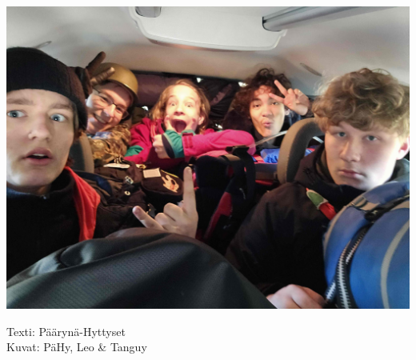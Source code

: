 \begin{multicols}{2}
\smallskip
\noindent\includegraphics[width=1.0\linewidth]{assets/telttaretki2}

\end{multicols}

\noindent\null\hfill Texti: Päärynä-Hyttyset\\
\noindent\null\hfill Kuvat: PäHy, Leo \& Tanguy\\

